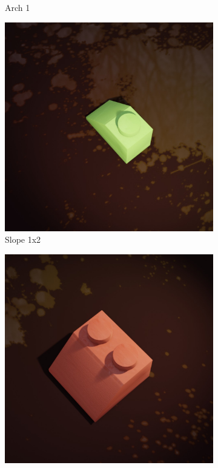\documentclass[]{article}
\begin{document}
\begin{figure}[h]
\begin{subfigure}[b]{0.15\textwidth}
        \caption{Arch 1}\par\medskip
    \end{subfigure}
    \begin{subfigure}[b]{0.15\textwidth}
        \centering
        \includegraphics[width=\textwidth]{Examples/slope-1x2.jpg}
        \caption{Slope 1x2}\par\medskip
    \end{subfigure}\par\medskip
    \begin{subfigure}[b]{0.15\textwidth}
        \centering
        \includegraphics[width=\textwidth]{Examples/slope-2x2.jpg}

\end{subfigure}
\end{figure}
\end{document}
